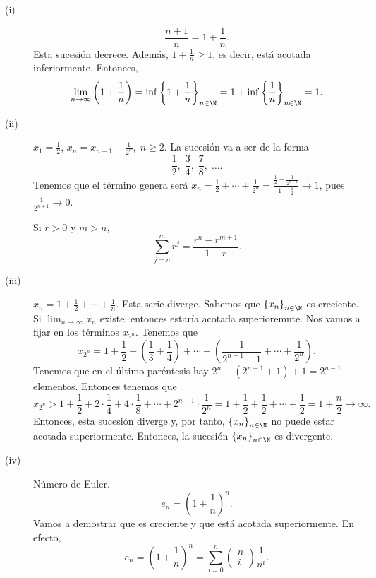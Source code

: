 \begin{eg}
\normalfont 
\begin{description}
\item[(i)] 
	\[\frac{n+1}{n} = 1 + \frac{1}{n} .\]
Esta sucesión decrece. Además, $\displaystyle 1+ \frac{1}{n} \geq 1 $, es decir, está acotada inferiormente. Entonces, 
\[\lim_{n \to \infty} \left(1 + \frac{1}{n}\right) = \inf \left\{ 1 + \frac{1}{n}\right\}_{n\in\N} = 1 + \inf \left\{ \frac{1}{n}\right\}_{n\in\N} = 1 .\]
\item[(ii)] $\displaystyle x_{1} = \frac{1}{2} $, $\displaystyle x_{n} = x_{n-1} + \frac{1}{2^{n}}, \; n\geq 2$. La sucesión va a ser de la forma
	\[\frac{1}{2}, \; \frac{3}{4}, \; \frac{7}{8}, \; \ldots .\]
Tenemos que el término genera será $\displaystyle x_{n} = \frac{1}{2} + \cdots + \frac{1}{2^{n}} = \frac{\frac{1}{2}-\frac{1}{2^{n+1}}}{1-\frac{1}{2}} \to 1 $, pues $\displaystyle \frac{1}{2^{n+1}}\to 0 $. 
\begin{observation}
\normalfont Si $\displaystyle r > 0 $ y $\displaystyle m > n $, 
\[\sum^{m}_{j=n}r^{j} = \frac{r^{n}-r^{m+1}}{1-r} .\]
\end{observation}
\item[(iii)] $\displaystyle x_{n} = 1 + \frac{1}{2} + \cdots + \frac{1}{n} $. Esta serie diverge. Sabemos que $\displaystyle \left\{ x_{n}\right\} _{n\in\N} $ es creciente. Si $\displaystyle \lim_{n \to \infty}x_{n} $ existe, entonces estaría acotada superioremnte. Nos vamos a fijar en los términos $\displaystyle x_{2^{n}} $. Tenemos que 
	\[x_{2^{n}} = 1 + \frac{1}{2} + \left(\frac{1}{3} + \frac{1}{4}\right) + \cdots + \left(\frac{1}{2^{n-1}+1} + \cdots + \frac{1}{2^{n}}\right) .\]
Tenemos que en el último paréntesis hay $\displaystyle 2^{n}-\left(2^{n-1}+1\right) + 1 = 2^{n-1} $ elementos. Entonces tenemos que
\[ x_{2^{n}} > 1 + \frac{1}{2} + 2 \cdot \frac{1}{4} + 4 \cdot \frac{1}{8} + \cdots + 2^{n-1} \cdot \frac{1}{2^{n}} = 1 + \frac{1}{2} + \frac{1}{2} + \cdots + \frac{1}{2} = 1 + \frac{n}{2} \to \infty .\]
Entonces, esta sucesión diverge y, por tanto, $\displaystyle \left\{ x_{n}\right\} _{n\in\N} $ no puede estar acotada superiormente. Entonces, la sucesión $\displaystyle \left\{ x_{n}\right\} _{n\in\N} $ es divergente.
\item[(iv)] Número de Euler. 
	\[e_{n} = \left(1 + \frac{1}{n}\right)^{n} .\]
Vamos a demostrar que es creciente y que está acotada superiormente. En efecto, 
\[e_{n} = \left(1 + \frac{1}{n}\right)^{n} = \sum^{n}_{i = 0}\begin{pmatrix} n \\ i \end{pmatrix} \frac{1}{n^{i}}.\]

\end{description}
\end{eg}
